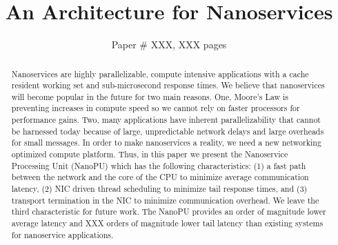 \documentclass[sigconf]{acmart}
\begin{document}
\title{An Architecture for Nanoservices}


\author{Paper \# XXX, XXX pages}

\renewcommand{\shortauthors}{X.et al.}

\begin{abstract}
Nanoservices are highly parallelizable, compute intensive applications with a cache resident working set and sub-microsecond response times. We believe that nanoservices will become popular in the future for two main reasons. One, Moore's Law is preventing increases in compute speed so we cannot rely on faster processors for performance gains. Two, many applications have inherent parallelizability that cannot be harnessed today because of large, unpredictable network delays and large overheads for small messages. In order to make nanoservices a reality, we need a new networking optimized compute platform. Thus, in this paper we present the Nanoservice Processing Unit (NanoPU) which has the following characteristics: (1) a fast path between the network and the core of the CPU to minimize average communication latency, (2) NIC driven thread scheduling to minimize tail response times, and (3) transport termination in the NIC to minimize communication overhead. We leave the third characteristic for future work. The NanoPU provides an order of magnitude lower average latency and XXX orders of magnitude lower tail latency than existing systems for nanoservice applications.
\end{abstract}

\maketitle





\end{document}
